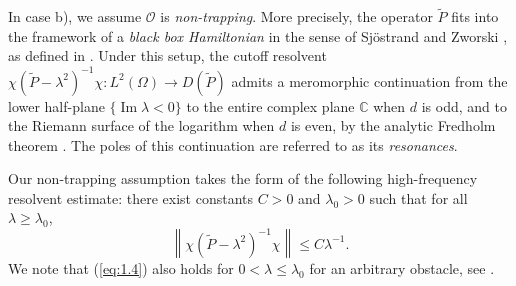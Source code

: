 \documentclass[11pt]{amsart}
\numberwithin{equation}{section}
\begin{document}
In case b), we assume $\mathcal{O}$ is \textit{non-trapping}. More precisely, the operator $\widetilde{P}$ fits into the framework of a \textit{black box Hamiltonian} in the sense of Sjöstrand and Zworski \cite{kn:SZ91}, as defined in \cite[Definition 4.1]{kn:dz}. Under this setup, the cutoff resolvent $\chi (\widetilde{P} - \lambda^2)^{-1} \chi : L^2(\Omega) \to D(\widetilde{P})$ admits a meromorphic continuation from the lower half-plane $\{\operatorname{Im} \lambda < 0\}$ to the entire complex plane $\mathbb{C}$ when $d$ is odd, and to the Riemann surface of the logarithm when $d$ is even, by the analytic Fredholm theorem \cite[Theorem 4.4]{kn:dz}. The poles of this continuation are referred to as its \textit{resonances}.

Our non-trapping assumption takes the form of the following high-frequency resolvent estimate: there exist constants $C > 0$ and $\lambda_0 > 0$ such that for all $\lambda \ge \lambda_0$,
\begin{equation}\label{eq:1.4}
\left\|\chi(\widetilde{P} - \lambda^2)^{-1} \chi\right\| \le C \lambda^{-1}.
\end{equation}
We note that (\ref{eq:1.4}) also holds for $0<\lambda\le\lambda_0$ for an arbitrary obstacle, see \cite[Appendix B]{kn:B1}.
\end{document}
